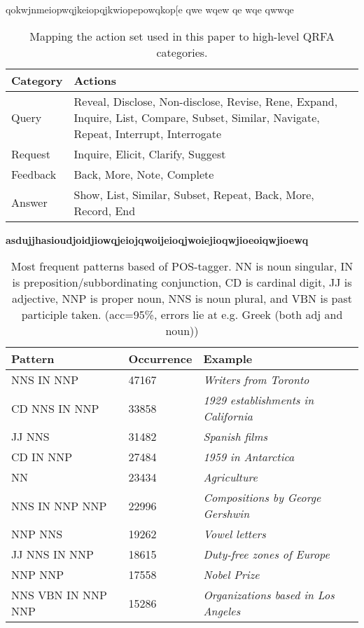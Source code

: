 qokwjnmeiopwqjkeiopqjkwiopepowqkop[e
qwe
wqew
qe
wqe
qwwqe


\begin{table}[t]
	\caption{Mapping the action set used in this paper to high-level QRFA categories.}
	\captionshrink
	\small
	\begin{tabular}{@{~}lp{6.7cm}}
	\toprule
	\textbf{Category} & \textbf{Actions} \\
	\midrule
	Query & Reveal, Disclose, Non-disclose, Revise, Rene, Expand, Inquire, List, Compare, Subset, Similar, Navigate, Repeat, Interrupt, Interrogate \\
	Request & Inquire, Elicit, Clarify, Suggest \\
	Feedback & Back, More, Note, Complete \\
	Answer & Show, List, Similar, Subset, Repeat, Back, More, Record, End \\
	\bottomrule
	\end{tabular}
\label{tbl:actions_qrfa}
\end{table}

\textbf{asdujjhasioudjoidjiowqjeiojqwoijeioqjwoiejioqwjioeoiqwjioewq}

\begin{table}[t]
\footnotesize
  \centering
  \caption{Most frequent patterns based of POS-tagger.
  NN is noun singular, IN is preposition/subbordinating conjunction, CD is cardinal digit, JJ is adjective, NNP is proper noun, NNS is noun plural, and VBN is past participle taken.  (acc=95\%, errors lie at e.g. Greek (both adj and noun))}
  \begin{tabular}{lll}
    \toprule
    Pattern & Occurrence & Example \\
    \midrule
    NNS IN NNP & 47167 & \emph{Writers from Toronto} \\
    CD NNS IN NNP & 33858 & \emph{1929 establishments in California} \\
    JJ NNS & 31482 & \emph{Spanish films} \\
    CD IN NNP & 27484 & \emph{1959 in Antarctica} \\
    NN & 23434 & \emph{Agriculture} \\
    NNS IN NNP NNP & 22996 & \emph{Compositions by George Gershwin}\\
    NNP NNS & 19262 & \emph{Vowel letters} \\
    JJ NNS IN NNP & 18615 & \emph{Duty-free zones of Europe} \\
    NNP NNP & 17558 & \emph{Nobel Prize} \\
    NNS VBN IN NNP NNP & 15286 & \emph{Organizations based in Los Angeles} \\
    \bottomrule
  \end{tabular}
  \label{tbl:pattern}
\end{table}
